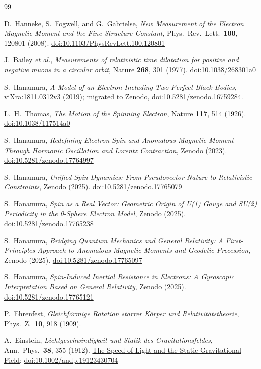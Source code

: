 \documentclass[%
 reprint, amsmath,amssymb, aps, prb, ]{revtex4-2}
\numberwithin{equation}{section}
\begin{document}
\begin{thebibliography}{99}

D.~Hanneke, S.~Fogwell, and G.~Gabrielse,
\textit{New Measurement of the Electron Magnetic Moment and the Fine Structure Constant},
Phys.\ Rev.\ Lett.\ \textbf{100}, 120801 (2008).
\href{https://doi.org/10.1103/PhysRevLett.100.120801}{doi:10.1103/PhysRevLett.100.120801}

J.~Bailey \textit{et al.},
\textit{Measurements of relativistic time dilatation for positive and negative muons in a circular orbit},
Nature \textbf{268}, 301 (1977).
\href{https://doi.org/10.1038/268301a0}{doi:10.1038/268301a0}

S.~Hanamura,
\textit{A Model of an Electron Including Two Perfect Black Bodies},
viXra:1811.0312v3 (2019); migrated to Zenodo,
\href{https://doi.org/10.5281/zenodo.16759284}{doi:10.5281/zenodo.16759284}.

L.~H.~Thomas,
\textit{The Motion of the Spinning Electron},
Nature \textbf{117}, 514 (1926).
\href{https://doi.org/10.1038/117514a0}{doi:10.1038/117514a0}

S.~Hanamura,
\textit{Redefining Electron Spin and Anomalous Magnetic Moment Through Harmonic Oscillation and Lorentz Contraction},
Zenodo (2023).
\href{https://doi.org/10.5281/zenodo.17764997}{doi:10.5281/zenodo.17764997}

S.~Hanamura,
\textit{Unified Spin Dynamics: From Pseudovector Nature to Relativistic Constraints},
Zenodo (2025).
\href{https://doi.org/10.5281/zenodo.17765079}{doi:10.5281/zenodo.17765079}

S.~Hanamura,
\textit{Spin as a Real Vector: Geometric Origin of U(1) Gauge and SU(2) Periodicity
in the 0-Sphere Electron Model},
Zenodo (2025).
\href{https://doi.org/10.5281/zenodo.17765238}{doi:10.5281/zenodo.17765238}

S.~Hanamura,
\textit{Bridging Quantum Mechanics and General Relativity: A First-Principles Approach
to Anomalous Magnetic Moments and Geodetic Precession},
Zenodo (2025).
\href{https://doi.org/10.5281/zenodo.17765097}{doi:10.5281/zenodo.17765097}

S.~Hanamura,
\textit{Spin-Induced Inertial Resistance in Electrons:
A Gyroscopic Interpretation Based on General Relativity},
Zenodo (2025).
\href{https://doi.org/10.5281/zenodo.17765121}{doi:10.5281/zenodo.17765121}

P.~Ehrenfest,
\textit{Gleichf\"{o}rmige Rotation starrer K\"{o}rper und Relativit\"{a}tstheorie},
Phys.\ Z.\ \textbf{10}, 918 (1909).

A.~Einstein,
\textit{Lichtgeschwindigkeit und Statik des Gravitationsfeldes},
Ann.\ Phys.\ \textbf{38}, 355 (1912).
\href{http://myweb.rz.uni-augsburg.de/~eckern/adp/history/einstein-papers/1912_38_355-369.pdf}{The Speed of Light and the Static Gravitational Field};
\href{https://doi.org/10.1002/andp.19123430704}{doi:10.1002/andp.19123430704}

\end{thebibliography}
\end{document}
